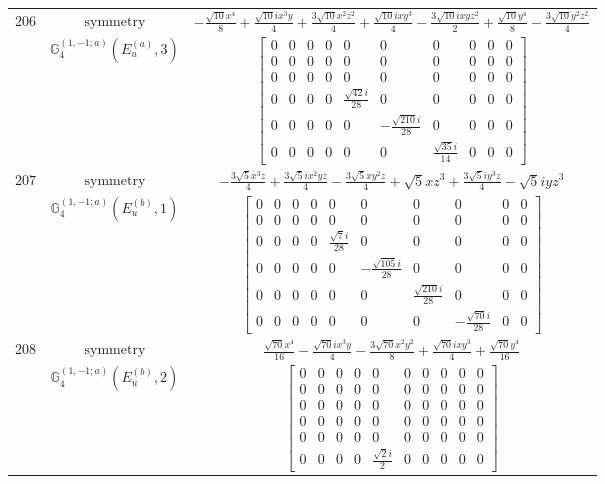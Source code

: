\documentclass[fleqn,8pt,landscape]{jsarticle}
\begin{document}
\begin{longtable}{ccc}
$ 206 $ & $ \text{symmetry} $ & $ - \frac{\sqrt{10} x^{4}}{8} + \frac{\sqrt{10} i x^{3} y}{4} + \frac{3 \sqrt{10} x^{2} z^{2}}{4} + \frac{\sqrt{10} i x y^{3}}{4} - \frac{3 \sqrt{10} i x y z^{2}}{2} + \frac{\sqrt{10} y^{4}}{8} - \frac{3 \sqrt{10} y^{2} z^{2}}{4} $ \\
$  $ & $ \mathbb{G}_{4}^{(1,-1;a)}(E_{u}^{(a)},3) $ & $ \begin{bmatrix} 0 & 0 & 0 & 0 & 0 & 0 & 0 & 0 & 0 & 0 \\ 0 & 0 & 0 & 0 & 0 & 0 & 0 & 0 & 0 & 0 \\ 0 & 0 & 0 & 0 & 0 & 0 & 0 & 0 & 0 & 0 \\ 0 & 0 & 0 & 0 & \frac{\sqrt{42} i}{28} & 0 & 0 & 0 & 0 & 0 \\ 0 & 0 & 0 & 0 & 0 & - \frac{\sqrt{210} i}{28} & 0 & 0 & 0 & 0 \\ 0 & 0 & 0 & 0 & 0 & 0 & \frac{\sqrt{35} i}{14} & 0 & 0 & 0 \end{bmatrix} $ \\ \hline
$ 207 $ & $ \text{symmetry} $ & $ - \frac{3 \sqrt{5} x^{3} z}{4} + \frac{3 \sqrt{5} i x^{2} y z}{4} - \frac{3 \sqrt{5} x y^{2} z}{4} + \sqrt{5} x z^{3} + \frac{3 \sqrt{5} i y^{3} z}{4} - \sqrt{5} i y z^{3} $ \\
$  $ & $ \mathbb{G}_{4}^{(1,-1;a)}(E_{u}^{(b)},1) $ & $ \begin{bmatrix} 0 & 0 & 0 & 0 & 0 & 0 & 0 & 0 & 0 & 0 \\ 0 & 0 & 0 & 0 & 0 & 0 & 0 & 0 & 0 & 0 \\ 0 & 0 & 0 & 0 & \frac{\sqrt{7} i}{28} & 0 & 0 & 0 & 0 & 0 \\ 0 & 0 & 0 & 0 & 0 & - \frac{\sqrt{105} i}{28} & 0 & 0 & 0 & 0 \\ 0 & 0 & 0 & 0 & 0 & 0 & \frac{\sqrt{210} i}{28} & 0 & 0 & 0 \\ 0 & 0 & 0 & 0 & 0 & 0 & 0 & - \frac{\sqrt{70} i}{28} & 0 & 0 \end{bmatrix} $ \\ \hline
$ 208 $ & $ \text{symmetry} $ & $ \frac{\sqrt{70} x^{4}}{16} - \frac{\sqrt{70} i x^{3} y}{4} - \frac{3 \sqrt{70} x^{2} y^{2}}{8} + \frac{\sqrt{70} i x y^{3}}{4} + \frac{\sqrt{70} y^{4}}{16} $ \\
$  $ & $ \mathbb{G}_{4}^{(1,-1;a)}(E_{u}^{(b)},2) $ & $ \begin{bmatrix} 0 & 0 & 0 & 0 & 0 & 0 & 0 & 0 & 0 & 0 \\ 0 & 0 & 0 & 0 & 0 & 0 & 0 & 0 & 0 & 0 \\ 0 & 0 & 0 & 0 & 0 & 0 & 0 & 0 & 0 & 0 \\ 0 & 0 & 0 & 0 & 0 & 0 & 0 & 0 & 0 & 0 \\ 0 & 0 & 0 & 0 & 0 & 0 & 0 & 0 & 0 & 0 \\ 0 & 0 & 0 & 0 & \frac{\sqrt{2} i}{2} & 0 & 0 & 0 & 0 & 0 \end{bmatrix} $ \\ \hline

\end{longtable}
\end{document}
